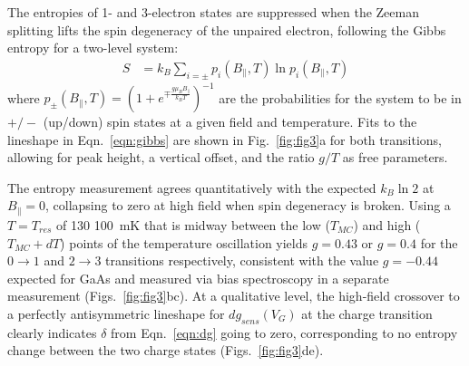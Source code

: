 \documentclass[twocolumn,showpacs,preprintnumbers,amsmath,amssymb,pra,aps,superscriptaddress]{revtex4-1}
\begin{document}
The entropies of 1- and 3-electron states are suppressed when the Zeeman splitting lifts the spin degeneracy of the unpaired electron, following the Gibbs entropy for a two-level system:
%
\begin{align}
\label{eqn:gibbs}
        S &= k_B \sum_{i=\pm} p_{i}(B_\parallel, T) \ln{ p_{i}(B_\parallel,T) }
\end{align}
%
where $p_{\pm}(B_\parallel, T) = (1+ e^{\mp \frac{g\mu_B B_{\parallel}}{k_B T}})^{-1}$ are the probabilities for the system to be in $+/-$ (up/down) spin states at a given field and temperature. Fits to the lineshape in Eqn.~\ref{eqn:gibbs} are shown in Fig.~\ref{fig:fig3}a for both transitions, allowing for peak height, a vertical offset, and the ratio $g/T$ as free parameters.

The entropy measurement agrees quantitatively with the expected $k_{B} \ln{2}$ at $B_\parallel=0$, collapsing to zero at high field when spin degeneracy is broken.  Using a $T=T_{res}$ of 130 \SI{100}{\milli\kelvin} that is midway between the low ($T_{MC}$) and high ($T_{MC}+dT$) points of the temperature oscillation yields $g=0.43$ or $g=0.4$ for the $0\rightarrow 1$ and $2\rightarrow 3$ transitions respectively, consistent with the value $g=-0.44$ expected for GaAs and measured via bias spectroscopy in a separate measurement (Figs.~\ref{fig:fig3}bc).  At a qualitative level, the high-field crossover to a perfectly antisymmetric lineshape for $dg_{sens}(V_G)$ at the charge transition clearly indicates $\delta$ from Eqn.~\ref{eqn:dg} going to zero, corresponding to no entropy change between the two charge states (Figs.~\ref{fig:fig3}de). 
\end{document}
